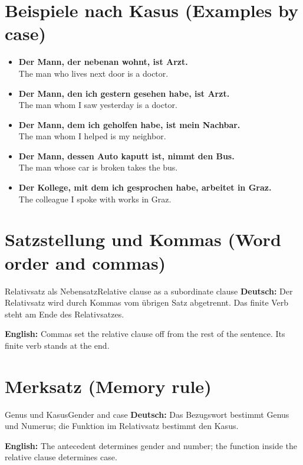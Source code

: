 \documentclass[a4paper,11pt]{article}
\newcommand{\GermanText}[1]{\textbf{Deutsch: }#1\par}
\newcommand{\EnglishText}[1]{{\small\color{SoftGray}\textbf{English: }#1\par}}
\newcommand{\ExampleItem}[2]{\item \textbf{#1}\\{\small\color{SoftGray}#2}}
\begin{document}
\section{Beispiele nach Kasus (Examples by case)}
\begin{exbox}\begin{itemize}
\ExampleItem{Der Mann, der nebenan wohnt, ist Arzt.}{The man who lives next door is a doctor.}
\ExampleItem{Der Mann, den ich gestern gesehen habe, ist Arzt.}{The man whom I saw yesterday is a doctor.}
\ExampleItem{Der Mann, dem ich geholfen habe, ist mein Nachbar.}{The man whom I helped is my neighbor.}
\ExampleItem{Der Mann, dessen Auto kaputt ist, nimmt den Bus.}{The man whose car is broken takes the bus.}
\ExampleItem{Der Kollege, mit dem ich gesprochen habe, arbeitet in Graz.}{The colleague I spoke with works in Graz.}
\end{itemize}\end{exbox}

\section{Satzstellung und Kommas (Word order and commas)}
\begin{grammarentry}{Relativsatz als Nebensatz}{Relative clause as a subordinate clause}
\GermanText{Der Relativsatz wird durch Kommas vom übrigen Satz abgetrennt. Das finite Verb steht am Ende des Relativsatzes.}
\EnglishText{Commas set the relative clause off from the rest of the sentence. Its finite verb stands at the end.}
\end{grammarentry}

\section{Merksatz (Memory rule)}
\begin{grammarentry}{Genus und Kasus}{Gender and case}
\GermanText{Das Bezugswort bestimmt Genus und Numerus; die Funktion im Relativsatz bestimmt den Kasus.}
\EnglishText{The antecedent determines gender and number; the function inside the relative clause determines case.}
\end{grammarentry}
\end{document}

